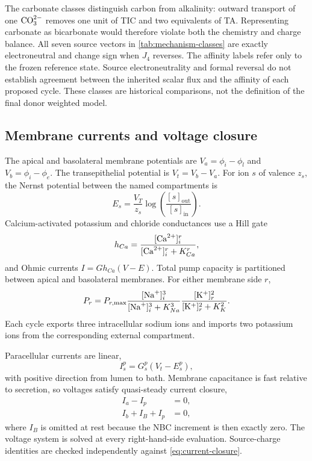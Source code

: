 The carbonate classes distinguish carbon from alkalinity: outward transport of one $\mathrm{CO}_{3}^{2-}$ removes one unit of TIC and two equivalents of TA. Representing carbonate as bicarbonate would therefore violate both the chemistry and charge balance. All seven source vectors in \cref{tab:mechanism-classes} are exactly electroneutral and change sign when $J_4$ reverses. The affinity labels refer only to the frozen reference state. Source electroneutrality and formal reversal do not establish agreement between the inherited scalar flux and the affinity of each proposed cycle. These classes are historical comparisons, not the definition of the final donor weighted model.

\subsection{Membrane currents and voltage closure}

The apical and basolateral membrane potentials are $V_a=\phi_i-\phi_l$ and $V_b=\phi_i-\phi_e$. The transepithelial potential is $V_t=V_b-V_a$. For ion $s$ of valence $z_s$, the Nernst potential between the named compartments is
\begin{equation*}
    E_s=\frac{V_T}{z_s}\log\!\left(\frac{[s]_{\mathrm{out}}}{[s]_{\mathrm{in}}}\right).
\end{equation*}
Calcium-activated potassium and chloride conductances use a Hill gate
\begin{equation*}
    h_{Ca}=\frac{[\mathrm{Ca}^{2+}]_i^r}{[\mathrm{Ca}^{2+}]_i^r+K_{Ca}^r},
\end{equation*}
and Ohmic currents $I=Gh_{Ca}(V-E)$. Total pump capacity is partitioned between apical and basolateral membranes. For either membrane side $r$,
\begin{equation*}
    P_r=P_{r,\max}
    \frac{[\mathrm{Na}^{+}]_i^3}{[\mathrm{Na}^{+}]_i^3+K_{Na}^3}
    \frac{[\mathrm{K}^{+}]_r^2}{[\mathrm{K}^{+}]_r^2+K_K^2}.
\end{equation*}
Each cycle exports three intracellular sodium ions and imports two potassium ions from the corresponding external compartment.

Paracellular currents are linear,
\begin{equation*}
    I_s^p=G_s^p(V_t-E_s^p),
\end{equation*}
with positive direction from lumen to bath. Membrane capacitance is fast relative to secretion, so voltages satisfy quasi-steady current closure,
\begin{equation}
\begin{aligned}
    I_a-I_p&=0,\\
    I_b+I_B+I_p&=0,
\end{aligned}
\label{eq:current-closure}
\end{equation}
where $I_B$ is omitted at rest because the NBC increment is then exactly zero. The voltage system is solved at every right-hand-side evaluation. Source-charge identities are checked independently against \cref{eq:current-closure}.

